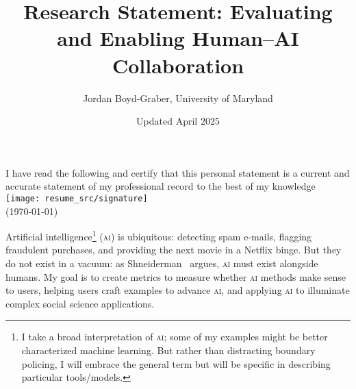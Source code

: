 \usepackage{graphicx}
\usepackage{amssymb}
\usepackage{mfirstuc}
\usepackage{colortbl}
\usepackage{epstopdf}
\usepackage{mdwlist}
\usepackage{url}

\newcommand{\abr}[1]{\textsc{#1}}
\newcommand{\newcite}[2]{\capitalisewords{#1} et al.~\cite{#1-#2}}



\newcommand{\student}[1]{\vspace{.5cm}\fbox{\parbox{0.95\linewidth}{{\small
        #1}}}\vspace{.5cm}}
\providecommand{\blue}[1]{{\color{blue}{#1}}}
\providecommand{\red}[1]{{\color{red}{#1}}}
\providecommand{\green}[1]{{\color{green}{#1}}}



 \title{Research Statement: Evaluating and Enabling Human--AI Collaboration}

 \author{Jordan Boyd-Graber, University of Maryland}


\date{Updated April 2025}

\maketitle

\ifumd
\vspace{.2cm}
  \parbox{\linewidth}{I have read the following and certify that this
  personal statement is a current and accurate statement of my
  professional record to the best of my
  knowledge \flushright  \texttt{[image: resume\_src/signature]} \\
\flushright  (\today{})}
\vspace{.5cm}
\fi


Artificial intelligence\footnote{I take a broad interpretation of
\abr{ai}; some of my examples might be better characterized machine
learning.  But rather than distracting boundary policing, I will embrace
the general term but will be specific in describing particular tools/models.}
(\abr{ai}) is ubiquitous: detecting spam e-mails, flagging fraudulent
purchases, and providing the next movie in a Netflix binge.
%
But they do not exist in a vacuum: as
Shneiderman~\cite{shneiderman-21} argues, \abr{ai} must exist
alongside humans.
%
My goal is to create metrics to measure whether \abr{ai} methods make
sense to users, helping users craft examples to advance \abr{ai}, and
applying \abr{ai} to illuminate complex social
science applications.

